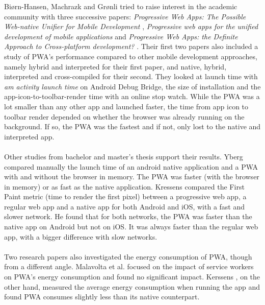 \documentclass{kththesis}
\begin{document}
Biørn-Hansen, Machrazk and Grønli tried to raise interest in the academic community with three successive papers: \textit{Progressive Web Apps: The Possible Web-native Unifier for Mobile Development} \cite{PWApossibleUnifer}, \textit{Progressive web apps for the unified development of mobile applications} \cite{Biorn-Hansen3} and \textit{Progressive Web Apps: the Definite Approach to Cross-platform development?} \cite{Biorn-Hansen3}. Their first two papers also included a study of PWA's performance compared to other mobile development approaches, namely hybrid and interpreted for their first paper, and native, hybrid, interpreted and cross-compiled for their second. They looked at launch time with \textit{am activity launch time} on Android Debug Bridge, the size of installation and the app-icon-to-toolbar-render time with an online stop watch. While the PWA was a lot smaller than any other app and launched faster, the time from app icon to toolbar render depended on whether the browser was already running on the background. If so, the PWA was the fastest and if not, only lost to the native and interpreted app. 

\paragraph{}
Other studies from bachelor and master's thesis support their results. Yberg \cite{YbergViktor2018NPaU} compared manually the launch time of an android native application and a PWA with and without the browser in memory. The PWA was faster (with the browser in memory) or as fast as the native application. Kressens \cite{PWAapplicability} compared the First Paint metric (time to render the first pixel) between a progressive web app, a regular web app and a native app for both Android and iOS, with a fast and slower network. He found that for both networks, the PWA was faster than the native app on Android but not on iOS. It was always faster than the regular web app, with a bigger difference with slow networks.



\paragraph{}
Two research papers also investigated the energy consumption of PWA, though from a different angle. Malavolta et al.\cite{SW_and_energy} focused on the impact of service workers on PWA's energy consumption and found no significant impact. Kerssens \cite{PWAapplicability}, on the other hand, measured the average energy consumption when running the app and found PWA consumes slightly less than its native counterpart. 
\end{document}
